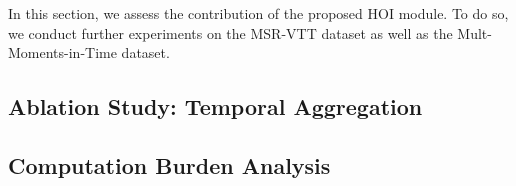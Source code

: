 In this section, we assess the contribution of the proposed HOI module.  To do so, we conduct further experiments on the MSR-VTT dataset as well as the Mult-Moments-in-Time dataset.

\subsection{Ablation Study: Temporal Aggregation}

\subsection{Computation Burden Analysis}